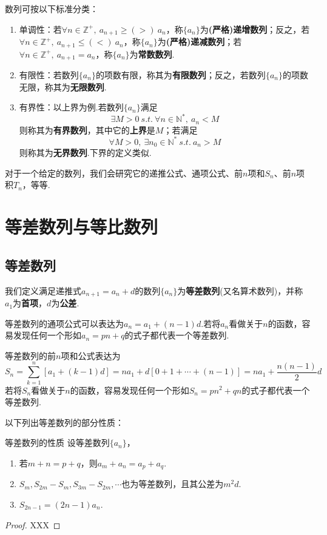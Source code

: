 \documentclass[lang=cn, zihao=4.5]{elegantbook}
\begin{document}
数列可按以下标准分类：
\begin{enumerate}
	\item 单调性：若$\forall n \in \mathbb{Z}^+,~ a_{n+1} \geq (>)~ a_n$，称$\{ a_n \}$为\textbf{(严格)递增数列}；反之，若$\forall n \in \mathbb{Z}^+,~ a_{n+1} \leq (<)~ a_n$，称$\{ a_n \}$为\textbf{(严格)递减数列}；若$\forall n \in \mathbb{Z}^+,~ a_{n+1} = a_n$，称$\{ a_n \}$为\textbf{常数数列}.
	\item 有限性：若数列$\{ a_n \}$的项数有限，称其为\textbf{有限数列}；反之，若数列$\{ a_n \}$的项数无限，称其为\textbf{无限数列}.
	\item 有界性：以上界为例.若数列$\{ a_n \}$满足
	$$\exists M > 0 ~s.t.~ \forall n \in \mathbb{N}^{*},~ a_n<M$$
	则称其为\textbf{有界数列}，其中它的\textbf{上界}是$M$；若满足
	$$\forall M > 0 ,~ \exists n_0 \in \mathbb{N}^{*} ~s.t.~ a_n>M$$
	则称其为\textbf{无界数列}.下界的定义类似.
\end{enumerate}

对于一个给定的数列，我们会研究它的递推公式、通项公式、前$n$项和$S_n$、前$n$项积$T_n$，等等.

\section{等差数列与等比数列}

\subsection{等差数列}

我们定义满足递推式$a_{n+1}=a_n+d$的数列$\{ a_n \}$为\textbf{等差数列}(又名算术数列)，并称$a_1$为\textbf{首项}，$d$为\textbf{公差}.

等差数列的通项公式可以表达为$a_n=a_1+(n-1)d$.若将$a_n$看做关于$n$的函数，容易发现任何一个形如$a_n=pn+q$的式子都代表一个等差数列.

等差数列的前$n$项和公式表达为$$S_n = \sum _{k=1}^{n} [a_1+(k-1)d] = na_1 + d[0+ 1 + \cdots +(n-1)] = na_1 + \frac{n(n-1)}{2}d$$
若将$S_n$看做关于$n$的函数，容易发现任何一个形如$S_n=pn^2+qn$的式子都代表一个等差数列.

以下列出等差数列的部分性质：

\begin{proposition}{等差数列的性质}
	设等差数列$\{ a_n \}$，
	\begin{enumerate}
		\item 若$m+n=p+q$，则$a_m+a_n=a_p+a_q$.
		\item $S_m,S_{2m}-S_m,S_{3m}-S_{2m},\cdots $也为等差数列，且其公差为$m^2d$.
		\item $S_{2n-1}=(2n-1)a_n$.
	\end{enumerate}
\end{proposition}
\begin{proof}
	XXX
\end{proof}
\end{document}
